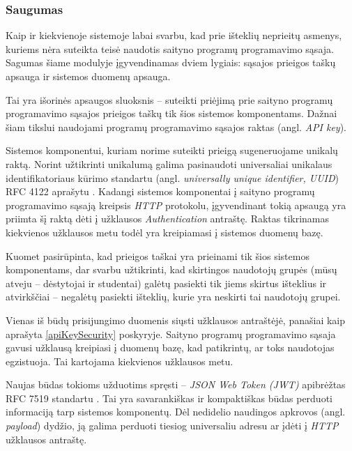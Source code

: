 \documentclass{VUMIFPSbakalaurinis}
\begin{document}
\subsubsection{Saugumas}

Kaip ir kiekvienoje sistemoje labai svarbu, kad prie išteklių neprieitų asmenys, kuriems nėra suteikta teisė naudotis saityno programų programavimo sąsaja. Sagumas šiame modulyje įgyvendinamas dviem lygiais: sąsajos prieigos taškų apsauga ir sistemos duomenų apsauga.

 \label{apiKeySecurity}

Tai yra išorinės apsaugos sluoksnis – suteikti priėjimą prie saityno programų programavimo sąsajos prieigos taškų tik šios sistemos komponentams. Dažnai šiam tikslui naudojami programų programavimo sąsajos raktas (angl. \textit{API key}).

Sistemos komponentui, kuriam norime suteikti prieigą sugeneruojame unikalų raktą. Norint užtikrinti unikalumą galima pasinaudoti universaliai unikalaus identifikatoriaus kūrimo standartu (angl. \textit{universally unique identifier, UUID}) RFC 4122 aprašytu \cite{uuidRef}. Kadangi sistemos komponentai į saityno programų programavimo sąsają kreipsis \textit{HTTP} protokolu, įgyvendinant tokią apsaugą yra priimta šį raktą dėti į užklausos \textit{Authentication} antraštę. Raktas tikrinamas kiekvienos užklausos metu todėl yra kreipiamasi į sistemos duomenų bazę.


Kuomet pasirūpinta, kad prieigos taškai yra prieinami tik šios sistemos komponentams, dar svarbu užtikrinti, kad skirtingos naudotojų grupės (mūsų atveju – dėstytojai ir studentai) galėtų pasiekti tik jiems skirtus išteklius ir atvirkščiai – negalėtų pasiekti išteklių, kurie yra neskirti tai naudotojų grupei.

Vienas iš būdų prisijungimo duomenis siųsti užklausos antraštėjė, panašiai kaip aprašyta \ref{apiKeySecurity} poskyryje. Saityno programų programavimo sąsaja gavusi užklausą kreipiasi į duomenų bazę, kad patikrintų, ar toks naudotojas egzistuoja. Tai kartojama kiekvienos užklausos metu.

Naujas būdas tokioms užduotims spręsti – \textit{JSON Web Token (JWT)}  apibrėžtas RFC 7519 standartu \cite{jwtRef}. Tai yra savarankiškas ir kompaktiškas būdas perduoti informaciją tarp sistemos komponentų. Dėl nedidelio naudingos apkrovos (angl. \textit{payload}) dydžio, ją galima perduoti tiesiog universaliu adresu ar įdėti į \textit{HTTP} užklausos antraštę.
\end{document}
